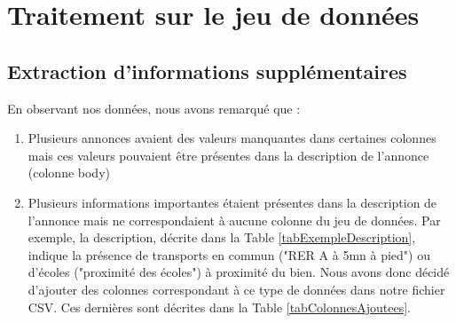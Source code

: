 \documentclass[a4paper, 12pt, twoside]{report}
\begin{document}
	\section{Traitement sur le jeu de données}

		\subsection{Extraction d’informations supplémentaires}

		En observant nos données, nous avons remarqué que :
		\begin{enumerate}
			\item Plusieurs annonces avaient des valeurs manquantes dans certaines colonnes mais ces valeurs pouvaient être présentes dans la description de l'annonce (colonne body) 
			\item Plusieurs informations importantes étaient présentes dans la description de l'annonce mais ne correspondaient à aucune colonne du jeu de données. Par exemple, la description, décrite dans la Table \ref{tabExempleDescription}, indique la présence de transports en commun ("RER A à 5mn à pied") ou d'écoles ("proximité des écoles") à proximité du bien. Nous avons donc décidé d'ajouter des colonnes correspondant à ce type de données dans notre fichier CSV. Ces dernières sont décrites dans la Table \ref{tabColonnesAjoutees}. \\
		\end{enumerate}
\end{document}
